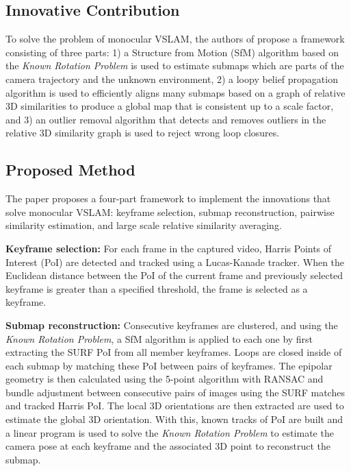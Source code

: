 \documentclass[10pt,twocolumn,letterpaper]{article}
\begin{document}
\subsection{Innovative Contribution}
To solve the problem of monocular VSLAM, the authors of \cite{Bourmaud_2015_CVPR} propose a 
framework consisting of three parts:
1) a Structure from Motion (SfM) algorithm based on the \textit{Known Rotation Problem} \cite{KRot}  
is used to estimate submaps which are parts of the camera trajectory and the unknown environment,
2) a loopy belief propagation algorithm is used to efficiently aligns many submaps based 
on a graph of relative 3D similarities to produce a global map that is consistent up to a scale factor, and
3) an outlier removal algorithm that detects and removes outliers in the relative 3D similarity 
graph is used to reject wrong loop closures.

\subsection{Proposed Method}
The paper proposes a four-part framework to implement the innovations that solve monocular VSLAM: 
keyframe selection, submap reconstruction, pairwise similarity estimation, and large scale 
relative similarity averaging.

\textbf{Keyframe selection:} For each frame in the captured video, Harris Points of Interest 
(PoI) are detected and tracked using a Lucas-Kanade tracker. When the Euclidean distance between 
the PoI of the current frame and previously selected keyframe is greater than a specified threshold, the 
frame is selected as a keyframe.

\textbf{Submap reconstruction:} Consecutive keyframes are clustered, and using the 
\textit{Known Rotation Problem}, a SfM algorithm is applied to each one by first extracting the SURF 
PoI \cite{Surf} from all member keyframes. Loops are closed inside of each submap by 
matching these PoI between pairs of keyframes. The epipolar geometry is then calculated 
using the 5-point algorithm with RANSAC and bundle adjustment \cite{5pt, Ransac} between consecutive pairs of images 
using the SURF matches and tracked Harris PoI. The local 3D orientations are then extracted are used to 
estimate the global 3D orientation. With this, known tracks of PoI are built and 
a linear program is used to solve the \textit{Known Rotation Problem} to estimate the camera pose at each 
keyframe and the associated 3D point to reconstruct the submap.
\end{document}
